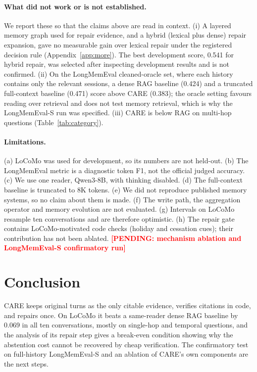 \documentclass[10pt]{article}
\theoremstyle{plain}
\newcommand{\care}{\textsc{CARE}}
\newcommand{\pending}[1]{\textcolor{red}{\textbf{[PENDING: #1]}}}
\begin{document}
\paragraph{What did not work or is not established.} We report these so that the claims above are read in context.
(i) A layered memory graph used for repair evidence, and a hybrid (lexical plus dense) repair expansion, gave no
measurable gain over lexical repair under the registered decision rule (Appendix~\ref{app:more}). The best development
score, 0.541 for hybrid repair, was selected after inspecting development results and is not confirmed. (ii) On the
LongMemEval cleaned-oracle set, where each history contains only the relevant sessions, a dense RAG baseline (0.424) and a
truncated full-context baseline (0.471) score above \care{} (0.383); the oracle setting favours reading over retrieval and
does not test memory retrieval, which is why the LongMemEval-S run was specified. (iii) \care{} is below RAG on multi-hop
questions (Table~\ref{tab:category}).

\paragraph{Limitations.} (a) LoCoMo was used for development, so its numbers are not held-out. (b) The LongMemEval metric
is a diagnostic token F1, not the official judged accuracy. (c) We use one reader, Qwen3-8B, with thinking disabled.
(d) The full-context baseline is truncated to 8K tokens. (e) We did not reproduce published memory systems, so no claim
about them is made. (f) The write path, the aggregation operator and memory evolution are not evaluated. (g) Intervals on
LoCoMo resample ten conversations and are therefore optimistic. (h) The repair gate contains LoCoMo-motivated code checks
(holiday and cessation cues); their contribution has not been ablated. \pending{mechanism ablation and LongMemEval-S
confirmatory run}

\section{Conclusion}

\care{} keeps original turns as the only citable evidence, verifies citations in code, and repairs once. On LoCoMo it
beats a same-reader dense RAG baseline by 0.069 in all ten conversations, mostly on single-hop and temporal questions, and
the analysis of its repair step gives a break-even condition showing why the abstention cost cannot be recovered by cheap
verification. The confirmatory test on full-history LongMemEval-S and an ablation of \care{}'s own components are the
next steps.
\end{document}
